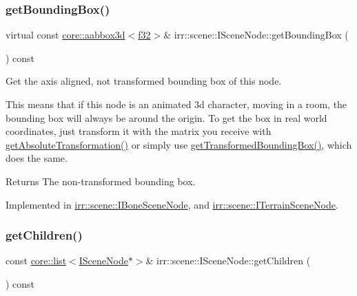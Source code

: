 \subsubsection{\texorpdfstring{get\+Bounding\+Box()}{getBoundingBox()}}
{\footnotesize\ttfamily virtual const \hyperlink{classirr_1_1core_1_1aabbox3d}{core\+::aabbox3d}$<$\hyperlink{namespaceirr_a0277be98d67dc26ff93b1a6a1d086b07}{f32}$>$\& irr\+::scene\+::\+I\+Scene\+Node\+::get\+Bounding\+Box (\begin{DoxyParamCaption}{ }\end{DoxyParamCaption}) const\hspace{0.3cm}{\ttfamily [pure virtual]}}



Get the axis aligned, not transformed bounding box of this node. 

This means that if this node is an animated 3d character, moving in a room, the bounding box will always be around the origin. To get the box in real world coordinates, just transform it with the matrix you receive with \hyperlink{classirr_1_1scene_1_1ISceneNode_af13dc546a7be796cc0868a2eec51e508}{get\+Absolute\+Transformation()} or simply use \hyperlink{classirr_1_1scene_1_1ISceneNode_a77746edcc479107067fbf1f4471ab412}{get\+Transformed\+Bounding\+Box()}, which does the same. \begin{DoxyReturn}{Returns}
The non-\/transformed bounding box. 
\end{DoxyReturn}


Implemented in \hyperlink{classirr_1_1scene_1_1IBoneSceneNode_ac5d0a610b0a24a7501f29ad000d28b3b}{irr\+::scene\+::\+I\+Bone\+Scene\+Node}, and \hyperlink{classirr_1_1scene_1_1ITerrainSceneNode_a02a14fe28f5a326fca819c36bee2e92e}{irr\+::scene\+::\+I\+Terrain\+Scene\+Node}.

\mbox{\label{classirr_1_1scene_1_1ISceneNode_a9a0e01ebfbf9f05e0caa147b290ffaf5}} 
\subsubsection{\texorpdfstring{get\+Children()}{getChildren()}}
{\footnotesize\ttfamily const \hyperlink{classirr_1_1core_1_1list}{core\+::list}$<$\hyperlink{classirr_1_1scene_1_1ISceneNode}{I\+Scene\+Node}$\ast$$>$\& irr\+::scene\+::\+I\+Scene\+Node\+::get\+Children (\begin{DoxyParamCaption}{ }\end{DoxyParamCaption}) const\hspace{0.3cm}{\ttfamily [inline]}}



